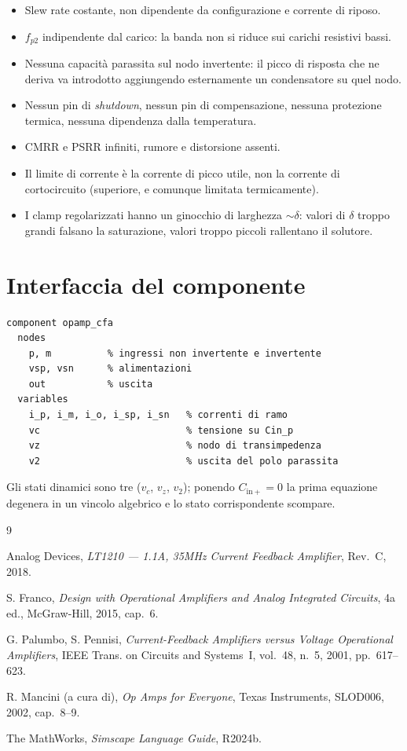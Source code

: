 \documentclass[11pt,a4paper]{article}
\begin{document}
\begin{itemize}
\item Slew rate costante, non dipendente da configurazione e corrente di
  riposo.
\item $f_{p2}$ indipendente dal carico: la banda non si riduce sui carichi
  resistivi bassi.
\item Nessuna capacità parassita sul nodo invertente: il picco di risposta
  che ne deriva va introdotto aggiungendo esternamente un condensatore su
  quel nodo.
\item Nessun pin di \emph{shutdown}, nessun pin di compensazione, nessuna
  protezione termica, nessuna dipendenza dalla temperatura.
\item CMRR e PSRR infiniti, rumore e distorsione assenti.
\item Il limite di corrente è la corrente di picco utile, non la corrente
  di cortocircuito (superiore, e comunque limitata termicamente).
\item I clamp regolarizzati hanno un ginocchio di larghezza $\sim\delta$:
  valori di $\delta$ troppo grandi falsano la saturazione, valori troppo
  piccoli rallentano il solutore.
\end{itemize}

\section{Interfaccia del componente}

\begin{lstlisting}
component opamp_cfa
  nodes
    p, m          % ingressi non invertente e invertente
    vsp, vsn      % alimentazioni
    out           % uscita
  variables
    i_p, i_m, i_o, i_sp, i_sn   % correnti di ramo
    vc                          % tensione su Cin_p
    vz                          % nodo di transimpedenza
    v2                          % uscita del polo parassita
\end{lstlisting}

Gli stati dinamici sono tre ($v_c$, $v_z$, $v_2$); ponendo
$C_{\mathrm{in}+}=0$ la prima equazione degenera in un vincolo algebrico e
lo stato corrispondente scompare.

\begin{thebibliography}{9}

Analog Devices, \emph{LT1210 --- 1.1A, 35MHz Current Feedback Amplifier},
Rev.~C, 2018.

S. Franco, \emph{Design with Operational Amplifiers and Analog Integrated
Circuits}, 4a ed., McGraw-Hill, 2015, cap.~6.

G. Palumbo, S. Pennisi, \emph{Current-Feedback Amplifiers versus
Voltage Operational Amplifiers}, IEEE Trans. on Circuits and Systems~I,
vol.~48, n.~5, 2001, pp.~617--623.

R. Mancini (a cura di), \emph{Op Amps for Everyone}, Texas Instruments,
SLOD006, 2002, cap.~8--9.

The MathWorks, \emph{Simscape Language Guide}, R2024b.

\end{thebibliography}
\end{document}
